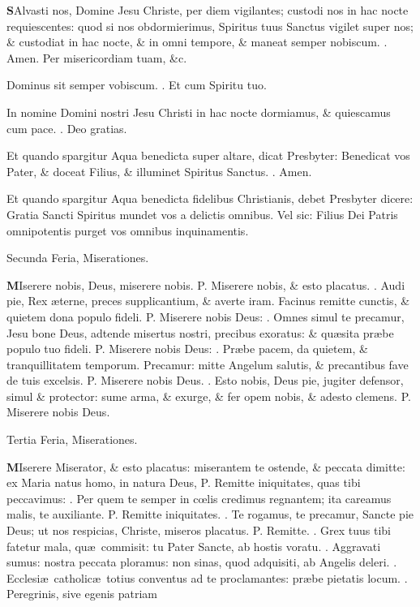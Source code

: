 \documentclass[letter,11pt]{book}
\makeatletter
\DeclareRobustCommand{\Vbar}{\vers@resp{-0.1em}{V}}
\DeclareRobustCommand{\Rbar}{\vers@resp{0pt}{R}}
\newcommand{\vers@resp@sym}{\raisebox{0.2ex}{\rotatebox[origin=c]{-20}{$\m@th\rceil$}}}
\newcommand{\vers@resp}[2]{%
  {\ooalign{\hidewidth\kern#1\vers@resp@sym\hidewidth\cr#2\cr}}%
}%
\def\P{\color{Red} P. \color{black}}
\def\V{\color{Red} \Vbar . \color{black}}
\def\R{\color{Red} \Rbar . \color{black}}
\makeatother
\begin{document}
\begin{multicols*}{2}
\lettrine[lines=2]{\bfseries \color{Red} S}{}Alvasti nos, Domine Jesu Christe, per diem vigilantes; custodi nos in hac nocte requiescentes: quod si nos obdormierimus, Spiritus tuus Sanctus vigilet super nos; \& custodiat in hac nocte, \& in omni tempore, \& maneat semper nobiscum. \R Amen. Per misericordiam tuam, \&c.
\par Dominus sit semper vobiscum. \R Et cum Spiritu tuo.
\par In nomine Domini nostri Jesu Christi in hac nocte dormiamus, \& quiescamus cum pace. \R Deo gratias.
\par \color{Red} Et quando spargitur Aqua benedicta super altare, dicat Presbyter: \color{black} Benedicat vos Pater, \& doceat Filius, \& illuminet Spiritus Sanctus. \R Amen.
\par \color{Red} Et quando spargitur Aqua benedicta fidelibus Christianis, debet Presbyter dicere: \color{black} Gratia Sancti Spiritus mundet vos a delictis omnibus. \color{Red} Vel sic: \color{black} Filius Dei Patris omnipotentis purget vos omnibus inquinamentis.
\vspace{-.5em} \begin{center} \color{Red} Secunda Feria, Miserationes. \end{center} \vspace{-.5em}
\lettrine[lines=2]{\bfseries \color{Red} M}{}Iserere nobis, Deus, miserere nobis. \P Miserere nobis, \& esto placatus. \V Audi pie, Rex \ae terne, preces supplicantium, \& averte iram. Facinus remitte cunctis, \& quietem dona populo fideli. \P Miserere nobis Deus: \V Omnes simul te precamur, Jesu bone Deus, adtende misertus nostri, precibus exoratus: \& qu\ae sita pr\ae be populo tuo fideli. \P Miserere nobis Deus: \V Pr\ae be pacem, da quietem, \& tranquillitatem temporum. Precamur: mitte Angelum salutis, \& precantibus fave de tuis excelsis. \P Miserere nobis Deus. \V Esto nobis, Deus pie, jugiter defensor, simul \& protector: sume arma, \& exurge, \& fer opem nobis, \& adesto clemens. \P Miserere nobis Deus.
\vspace{-.5em} \begin{center} \color{Red} Tertia Feria, Miserationes. \end{center} \vspace{-.5em}
\lettrine[lines=2]{\bfseries \color{Red} M}{}Iserere Miserator, \& esto placatus: miserantem te ostende, \& peccata dimitte: ex Maria natus homo, in natura Deus, \P Remitte iniquitates, quas tibi peccavimus: \V Per quem te semper in c\oe lis credimus regnantem; ita careamus malis, te auxiliante. \P Remitte iniquitates. \V Te rogamus, te precamur, Sancte pie Deus; ut nos respicias, Christe, miseros placatus. \P Remitte. \V Grex tuus tibi fatetur mala, qu\ae \ commisit: tu Pater Sancte, ab hostis voratu. \V Aggravati sumus: nostra peccata ploramus: non sinas, quod adquisiti, ab Angelis deleri. \V Ecclesi\ae \ catholic\ae \ totius conventus ad te proclamantes: pr\ae be pietatis locum. \V Peregrinis, sive egenis patriam

\end{multicols*}
\end{document}
